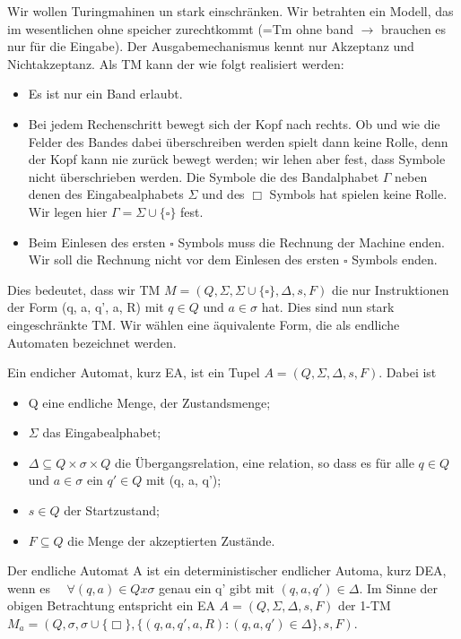 Wir wollen Turingmahinen un stark einschränken. Wir betrahten ein Modell, das im wesentlichen ohne speicher zurechtkommt (=Tm ohne band \(\longrightarrow\)  brauchen es nur für die Eingabe). Der Ausgabemechanismus kennt nur Akzeptanz und Nichtakzeptanz. Als TM kann der wie folgt realisiert werden:
\begin{itemize}
    \item Es ist nur ein Band erlaubt.
    \item Bei jedem Rechenschritt bewegt sich der Kopf nach rechts. Ob und wie die Felder des Bandes dabei überschreiben werden spielt dann keine Rolle, denn der Kopf kann nie zurück bewegt werden; wir lehen aber fest, dass Symbole nicht überschrieben werden. Die Symbole die des Bandalphabet \(\Gamma\)  neben denen des Eingabealphabets \(\Sigma\)  und des \(\Box\) Symbols hat spielen keine Rolle. Wir legen hier \(\varGamma  = \Sigma \cup  \{\square \}\) fest.
    \item Beim Einlesen des ersten \(\square\)  Symbols muss die Rechnung der Machine enden. Wir soll die Rechnung nicht vor dem Einlesen des ersten \(\square\) Symbols enden. 
\end{itemize}
Dies bedeutet, dass wir TM \(M = (Q, \Sigma, \Sigma \cup \{\square \}, \Delta, s, F)\) die nur Instruktionen der Form (q, a, q', a, R) mit \(q \in Q\) und \(a \in \sigma\) hat. Dies sind nun stark eingeschränkte TM. Wir wählen eine äquivalente Form, die als endliche Automaten bezeichnet werden. 

    Ein endicher Automat, kurz EA, ist ein Tupel \(A = (Q, \Sigma, \Delta, s, F)\). Dabei ist 
    \begin{itemize}
        \item Q eine endliche Menge, der Zustandsmenge;
        \item \(\Sigma\) das Eingabealphabet;
        \item \(\Delta \subseteq Q \times \sigma \times Q\) die Übergangsrelation, eine relation, so dass es für alle \(q \in Q\) und \( a\in \sigma\) ein \(q' \in Q\) mit (q, a, q');
        \item \(s \in Q\) der Startzustand;
        \item \(F \subseteq Q\) die Menge der akzeptierten Zustände.
    \end{itemize}
    Der endliche Automat A ist ein deterministischer endlicher Automa,
    kurz DEA, wenn es \(\quad \forall (q,a) \in Q x \sigma\) genau ein q' gibt mit \((q,a,q') \in \Delta\). Im Sinne der obigen Betrachtung entspricht ein EA \(A = (Q, \Sigma, \Delta, s, F)\) der 1-TM \(M_{a} = (Q, \sigma, \sigma \cup \{\Box\}, \{(q, a, q', a, R) : (q, a, q') \in \Delta\}, s, F)\).
